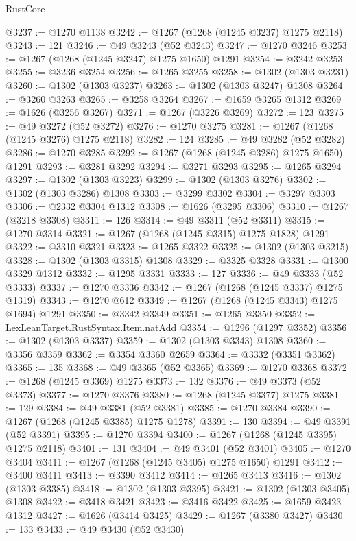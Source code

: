 \begin{lexlean}{RustCore}
\begin{coremodule}
@3237 := @1270 @1138
@3242 := @1267 (@1268 (@1245 @3237) @1275 @2118)
@3243 := 121
@3246 := @49 @3243 (@52 @3243)
@3247 := @1270 @3246
@3253 := @1267 (@1268 (@1245 @3247) @1275 @1650) @1291
@3254 := @3242 @3253
@3255 := @3236 @3254
@3256 := @1265 @3255
@3258 := @1302 (@1303 @3231)
@3260 := @1302 (@1303 @3237)
@3263 := @1302 (@1303 @3247) @1308
@3264 := @3260 @3263
@3265 := @3258 @3264
@3267 := @1659 @3265 @1312
@3269 := @1626 (@3256 @3267)
@3271 := @1267 (@3226 @3269)
@3272 := 123
@3275 := @49 @3272 (@52 @3272)
@3276 := @1270 @3275
@3281 := @1267 (@1268 (@1245 @3276) @1275 @2118)
@3282 := 124
@3285 := @49 @3282 (@52 @3282)
@3286 := @1270 @3285
@3292 := @1267 (@1268 (@1245 @3286) @1275 @1650) @1291
@3293 := @3281 @3292
@3294 := @3271 @3293
@3295 := @1265 @3294
@3297 := @1302 (@1303 @3223)
@3299 := @1302 (@1303 @3276)
@3302 := @1302 (@1303 @3286) @1308
@3303 := @3299 @3302
@3304 := @3297 @3303
@3306 := @2332 @3304 @1312
@3308 := @1626 (@3295 @3306)
@3310 := @1267 (@3218 @3308)
@3311 := 126
@3314 := @49 @3311 (@52 @3311)
@3315 := @1270 @3314
@3321 := @1267 (@1268 (@1245 @3315) @1275 @1828) @1291
@3322 := @3310 @3321
@3323 := @1265 @3322
@3325 := @1302 (@1303 @3215)
@3328 := @1302 (@1303 @3315) @1308
@3329 := @3325 @3328
@3331 := @1300 @3329 @1312
@3332 := @1295 @3331
@3333 := 127
@3336 := @49 @3333 (@52 @3333)
@3337 := @1270 @3336
@3342 := @1267 (@1268 (@1245 @3337) @1275 @1319)
@3343 := @1270 @612
@3349 := @1267 (@1268 (@1245 @3343) @1275 @1694) @1291
@3350 := @3342 @3349
@3351 := @1265 @3350
@3352 := LexLeanTarget.RustSyntax.Item.natAdd
@3354 := @1296 (@1297 @3352)
@3356 := @1302 (@1303 @3337)
@3359 := @1302 (@1303 @3343) @1308
@3360 := @3356 @3359
@3362 := @3354 @3360 @2659
@3364 := @3332 (@3351 @3362)
@3365 := 135
@3368 := @49 @3365 (@52 @3365)
@3369 := @1270 @3368
@3372 := @1268 (@1245 @3369) @1275
@3373 := 132
@3376 := @49 @3373 (@52 @3373)
@3377 := @1270 @3376
@3380 := @1268 (@1245 @3377) @1275
@3381 := 129
@3384 := @49 @3381 (@52 @3381)
@3385 := @1270 @3384
@3390 := @1267 (@1268 (@1245 @3385) @1275 @1278)
@3391 := 130
@3394 := @49 @3391 (@52 @3391)
@3395 := @1270 @3394
@3400 := @1267 (@1268 (@1245 @3395) @1275 @2118)
@3401 := 131
@3404 := @49 @3401 (@52 @3401)
@3405 := @1270 @3404
@3411 := @1267 (@1268 (@1245 @3405) @1275 @1650) @1291
@3412 := @3400 @3411
@3413 := @3390 @3412
@3414 := @1265 @3413
@3416 := @1302 (@1303 @3385)
@3418 := @1302 (@1303 @3395)
@3421 := @1302 (@1303 @3405) @1308
@3422 := @3418 @3421
@3423 := @3416 @3422
@3425 := @1659 @3423 @1312
@3427 := @1626 (@3414 @3425)
@3429 := @1267 (@3380 @3427)
@3430 := 133
@3433 := @49 @3430 (@52 @3430)

\end{coremodule}
\end{lexlean}
